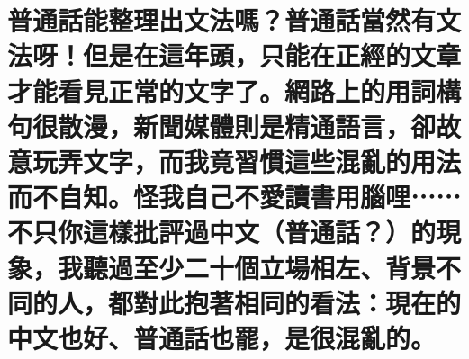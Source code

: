 %

\chapter[普通話能整理出文法嗎？普通話當然有文法呀！但是在這年頭，只能在正經的文章才能看見正常的文字了。網路上的用詞構句很散漫，新聞媒體則是精通語言，卻故意玩弄文字，而我竟習慣這些混亂的用法而不自知。怪我自己不愛讀書用腦哩⋯⋯不只你這樣批評過中文（普通話？）的現象，我聽過至少二十個立場相左、背景不同的人，都對此抱著相同的看法：現在的中文也好、普通話也罷，是很混亂的。]{普通話能整理出文法嗎？普通話當然有文法呀！但是在這年頭，只能在正經的文章才能看見正常的文字了。網路上的用詞構句很散漫，新聞媒體則是精通語言，卻故意玩弄文字，而我竟習慣這些混亂的用法而不自知。怪我自己不愛讀書用腦哩⋯⋯不只你這樣批評過中文（普通話？）的現象，我聽過至少二十個立場相左、背景不同的人，都對此抱著相同的看法：現在的中文也好、普通話也罷，是很混亂的。}

